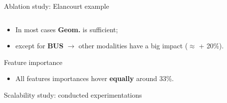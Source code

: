 \documentclass[10pt, export]{beamer}
\begin{document}
\begin{frame}{Ablation study: Elancourt example}
\begin{table}
\begin{center}
\begin{tabular}{|x{.7cm} | x{.8cm} x{.8cm} | x{.8cm} x{.8cm} | x{.8cm} x{.8cm} | x{.8cm} x{.8cm}|}
                        \hline
                    \end{tabular}
                \end{center}
            \end{table}
            \begin{itemize}[label=$\blacktriangleright$, font=\color{IGNGreen}]
                \item<2-> \footnotesize In most cases \textbf{Geom.} is sufficient;
                \item<3-> \footnotesize except for \textbf{BUS} $\rightarrow$ other modalities have a big impact ($\approx$ + 20\%).
            \end{itemize}
        \end{frame}
        \begin{frame}{Feature importance}
            \begin{figure}
                
            \end{figure}
            \begin{itemize}[label=$\blacktriangleright$, font=\color{IGNGreen}]
                \item<2-> \footnotesize All features importances hover \textbf{equally} around 33\%.
            \end{itemize}
        \end{frame}
        \begin{frame}{Scalability study: conducted experimentations}
            \begin{figure}
                
            \end{figure}
        \end{frame}
\end{document}
